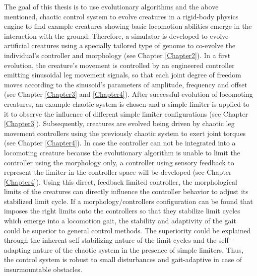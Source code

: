\documentclass[main]{subfiles}
\begin{document}
The goal of this thesis is to use evolutionary algorithms and the above mentioned, chaotic control system to evolve creatures in a rigid-body physics engine to find example creatures showing basic locomotion abilities emerge in the interaction with the ground. %
%
Therefore, a simulator is developed to evolve artificial creatures using a specially tailored type of genome to co-evolve the individual's controller and morphology (see Chapter \ref{Chapter2}). %
%
In a first evolution, the creature's movement is controlled by an engineered controller emitting sinusoidal leg movement signals, so that each joint degree of freedom moves according to the sinusoid's parameters of amplitude, frequency and offset (see Chapter \ref{Chapter3} and \ref{Chapter4}). %
%
After successful evolution of locomoting creatures, an example chaotic system is chosen and a simple limiter is applied to it to observe the influence of different simple limiter configurations (see Chapter \ref{Chapter3}). %
%
Subsequently, creatures are evolved being driven by chaotic leg movement controllers using the previously chaotic system to exert joint torques (see Chapter \ref{Chapter4}). %
%
In case the controller can not be integrated into a locomoting creature because the evolutionary algorithm is unable to limit the controller using the morphology only, a controller using sensory feedback to represent the limiter in the controller space will be developed (see Chapter \ref{Chapter4}). %
%
Using this direct, feedback limited controller, the morphological limits of the creatures can directly influence the controller behavior to adjust its stabilized limit cycle. %
%
If a morphology/controllers configuration can be found that imposes the right limits onto the controllers so that they stabilize limit cycles which emerge into a locomotion gait, the stability and adaptivity of the gait could be superior to general control methods. %
%
The superiority could be explained through the inherent self-stabilizing nature of the limit cycles and the self-adapting nature of the chaotic system in the presence of simple limiters. %
%
Thus, the control system is robust to small disturbances and gait-adaptive in case of insurmountable obstacles. %
\end{document}
